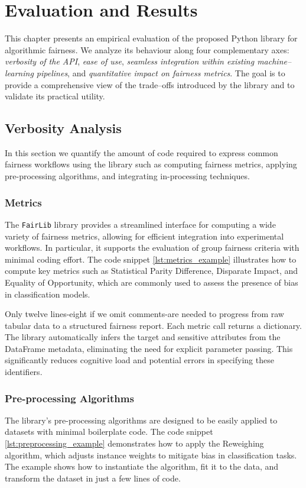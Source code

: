\documentclass[12pt,a4paper,openright,twoside]{book}
\begin{document}
\chapter{Evaluation and Results}


This chapter presents an empirical evaluation of the proposed Python library for algorithmic fairness. We analyze its behaviour along four complementary axes: \emph{verbosity of the API}, \emph{ease of use}, \emph{seamless integration within existing machine--learning pipelines}, and \emph{quantitative impact on fairness metrics}. The goal is to provide a comprehensive view of the trade--offs introduced by the library and to validate its practical utility.


\section{Verbosity Analysis}
In this section we quantify the amount of code required to express common fairness workflows using the library such as computing fairness metrics, applying pre-processing algorithms, and integrating in-processing techniques. 


\subsection{Metrics}
The \texttt{FairLib} library provides a streamlined interface for computing a wide variety of fairness metrics, allowing for efficient integration into experimental workflows. In particular, it supports the evaluation of group fairness criteria with minimal coding effort. The code snippet \ref{lst:metrics_example} illustrates how to compute key metrics such as Statistical Parity Difference, Disparate Impact, and Equality of Opportunity, which are commonly used to assess the presence of bias in classification models.



Only twelve lines-eight if we omit comments-are needed to progress from raw tabular data to a structured fairness report. Each metric call returns a dictionary. The library automatically infers the target and sensitive attributes from the DataFrame metadata, eliminating the need for explicit parameter passing. This significantly reduces cognitive load and potential errors in specifying these identifiers.

\subsection{Pre-processing Algorithms}
The library's pre-processing algorithms are designed to be easily applied to datasets with minimal boilerplate code. The code snippet \ref{lst:preprocessing_example} demonstrates how to apply the Reweighing algorithm, which adjusts instance weights to mitigate bias in classification tasks. The example shows how to instantiate the algorithm, fit it to the data, and transform the dataset in just a few lines of code.
\end{document}
